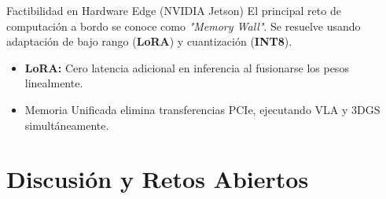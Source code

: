 \documentclass[aspectratio=169]{beamer}
\begin{document}
	\begin{frame}{Factibilidad en Hardware Edge (NVIDIA Jetson)}
		\justifying
		El principal reto de computación a bordo se conoce como \textit{"Memory Wall"}.
		Se resuelve usando adaptación de bajo rango (\textbf{LoRA}) y cuantización (\textbf{INT8}).
		
		\vspace{2ex}
		\begin{table}[htbp]
			\caption{Comparación Teórica de Consumo VRAM y Latencia}
			\centering
		\end{table}
		\begin{itemize}
			\item \textbf{LoRA:} Cero latencia adicional en inferencia al fusionarse los pesos linealmente.
			\item Memoria Unificada elimina transferencias PCIe, ejecutando VLA y 3DGS simultáneamente.
		\end{itemize}
	\end{frame}
	
	
	\section{Discusión y Retos Abiertos}
	
\end{document}
